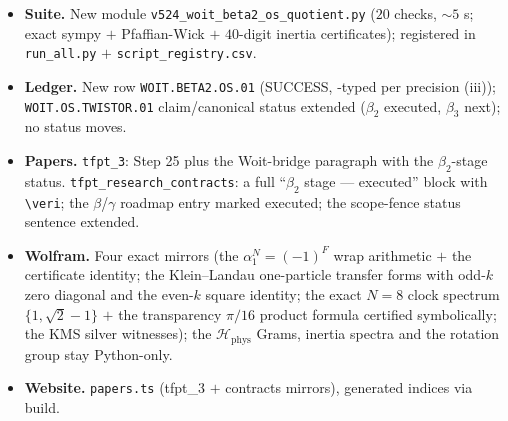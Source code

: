 \begin{itemize}[leftmargin=1.5em]
\item \textbf{Suite.} New module \texttt{v524\_woit\_beta2\_os\_quotient.py} ($20$ checks, $\sim5$ s;
exact sympy $+$ Pfaffian-Wick $+$ $40$-digit inertia certificates); registered in
\texttt{run\_all.py} $+$ \texttt{script\_registry.csv}.
\item \textbf{Ledger.} New row \texttt{WOIT.BETA2.OS.01} (SUCCESS, \mC-typed per precision
(iii)); \texttt{WOIT.OS.TWISTOR.01} claim/canonical status extended ($\beta_2$ executed,
$\beta_3$ next); no status moves.
\item \textbf{Papers.} \texttt{tfpt\_3}: Step 25 plus the Woit-bridge paragraph with the
$\beta_2$-stage status. \texttt{tfpt\_research\_contracts}: a full ``$\beta_2$ stage ---
executed'' block with \texttt{\textbackslash veri}; the $\beta$/$\gamma$ roadmap entry marked
executed; the scope-fence status sentence extended.
\item \textbf{Wolfram.} Four exact mirrors (the $\alpha_1^N=(-1)^F$ wrap arithmetic $+$ the
certificate identity; the Klein--Landau one-particle transfer forms with odd-$k$ zero diagonal
and the even-$k$ square identity; the exact $N=8$ clock spectrum $\{1,\sqrt2-1\}$ $+$ the
transparency $\pi/16$ product formula certified symbolically; the KMS silver witnesses); the
$\mathcal H_{\mathrm{phys}}$ Grams, inertia spectra and the rotation group stay Python-only.
\item \textbf{Website.} \texttt{papers.ts} (tfpt\_3 $+$ contracts mirrors), generated indices
via build.
\end{itemize}

